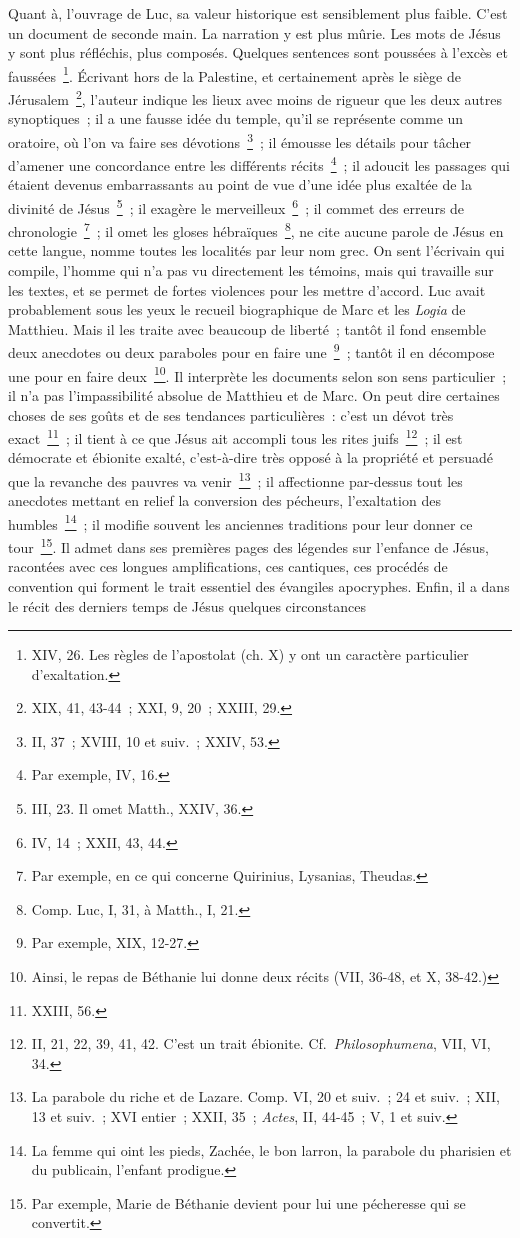 \documentclass[french,twoside]{book} %
\begin{document}
Quant à, l’ouvrage de Luc, sa valeur historique est sensiblement plus faible. C’est un document de seconde main. La narration y est plus mûrie. Les mots de Jésus y sont plus réfléchis, plus composés. Quelques sentences sont poussées à l’excès et faussées \footnote{XIV, 26. Les règles de l’apostolat (ch. X) y ont un caractère particulier d’exaltation.}. Écrivant hors de la Palestine, et certainement après le siège de Jérusalem \footnote{XIX, 41, 43-44 ; XXI, 9, 20 ; XXIII, 29.}, l’auteur indique les lieux avec moins de rigueur que les deux autres synoptiques ; il a une fausse idée du temple, qu’il se représente comme un oratoire, où l’on va faire ses dévotions \footnote{II, 37 ; XVIII, 10 et suiv. ; XXIV, 53.} ; il émousse les détails pour tâcher d’amener une concordance entre les différents récits \footnote{Par exemple, IV, 16.} ; il adoucit les passages qui étaient devenus embarrassants au point de vue d’une idée plus exaltée de la divinité de Jésus \footnote{III, 23. Il omet Matth., XXIV, 36.} ; il exagère le merveilleux \footnote{IV, 14 ; XXII, 43, 44.} ; il commet des erreurs de chronologie \footnote{Par exemple, en ce qui concerne Quirinius, Lysanias, Theudas.} ; il omet les gloses hébraïques \footnote{Comp. Luc, I, 31, à Matth., I, 21.}, ne cite aucune parole de Jésus en cette langue, nomme toutes les localités par leur nom grec. On sent l’écrivain qui compile, l’homme qui n’a pas vu directement les témoins, mais qui travaille sur les textes, et se permet de fortes violences pour les mettre d’accord. Luc avait probablement sous les yeux le recueil biographique de Marc et les {\itshape Logia} de Matthieu. Mais il les traite avec beaucoup de liberté ; tantôt il fond ensemble deux anecdotes ou deux paraboles pour en faire une \footnote{Par exemple, XIX, 12-27.} ; tantôt il en décompose une pour en faire deux \footnote{Ainsi, le repas de Béthanie lui donne deux récits (VII, 36-48, et X, 38-42.)}. Il interprète les documents selon son sens particulier ; il n’a pas l’impassibilité absolue de Matthieu et de Marc. On peut dire certaines choses de ses goûts et de ses tendances particulières : c’est un dévot très exact \footnote{XXIII, 56.} ; il tient à ce que Jésus ait accompli tous les rites juifs \footnote{ II, 21, 22, 39, 41, 42. C’est un trait ébionite. Cf. {\itshape Philosophumena}, VII, VI, 34.} ; il est démocrate et ébionite exalté, c’est-à-dire très opposé à la propriété et persuadé que la revanche des pauvres va venir \footnote{ La parabole du riche et de Lazare. Comp. VI, 20 et suiv. ; 24 et suiv. ; XII, 13 et suiv. ; XVI entier ; XXII, 35 ; {\itshape Actes}, II, 44-45 ; V, 1 et suiv.} ; il affectionne par-dessus tout les anecdotes mettant en relief la conversion des pécheurs, l’exaltation des humbles \footnote{La femme qui oint les pieds, Zachée, le bon larron, la parabole du pharisien et du publicain, l’enfant prodigue.} ; il modifie souvent les anciennes traditions pour leur donner ce tour \footnote{Par exemple, Marie de Béthanie devient pour lui une pécheresse qui se convertit.}. Il admet dans ses premières pages des légendes sur l’enfance de Jésus, racontées avec ces longues amplifications, ces cantiques, ces procédés de convention qui forment le trait essentiel des évangiles apocryphes. Enfin, il a dans le récit des derniers temps de Jésus quelques circonstances 
\end{document}
